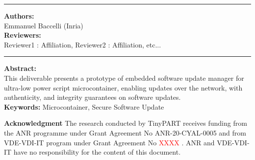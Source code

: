\begin{titlepage}
			
			\begin{center}
	
			\rule{0.5\linewidth}{1pt}
			
			\end{center}
		
			\vspace{0.5cm}
			
			\textbf{Authors: }\\
			Emmanuel Baccelli (Inria) \\%

	
	

			
			\textbf{Reviewers: }\\
			Reviewer1 : Affiliation, Reviewer2 : Affiliation, etc...\\  
						
			\begin{center}
	
				\rule{0.5\linewidth}{1pt}
	
			\end{center}

			\vspace{0.25cm}
			
			\textbf{Abstract: }\\
			This deliverable presents a prototype of embedded software update manager for ultra-low power script microcontainer, enabling updates over the network, with authenticity, and integrity guarantees on software updates. \\
			
			
			\textbf{Keywords:} Microcontainer, Secure Software Update \\		
			
			\vfill
			
			\begin{center}

					\small \textbf{Acknowledgment}
					The research conducted by TinyPART receives funding from the ANR programme under Grant Agreement No ANR-20-CYAL-0005 and from VDE-VDI-IT program under Grant Agreement No \textcolor{red}{XXXX} . ANR and VDE-VDI-IT have no responsibility for the content of this document. \\
				

\end{center}
\end{titlepage}

